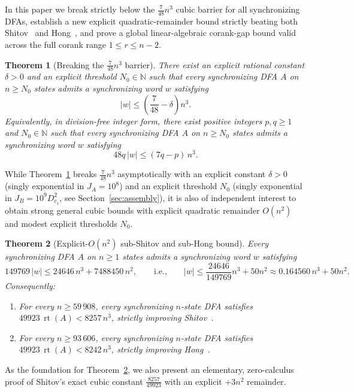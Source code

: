 \documentclass[11pt]{article}
\newtheorem{theorem}{Theorem}[section]
\theoremstyle{definition}
\theoremstyle{remark}
\newcommand{\rt}{\operatorname{rt}}
\newcommand{\N}{\mathbb{N}}
\begin{document}
In this paper we break strictly below the $\frac{7}{48} n^3$ cubic barrier for all synchronizing DFAs, establish a new explicit quadratic-remainder bound strictly beating both Shitov~\cite{Shitov2019} and Hong~\cite{Hong2026a}, and prove a global linear-algebraic corank-gap bound valid across the full corank range $1 \le r \le n - 2$.

\begin{theorem}[Breaking the $\frac{7}{48} n^3$ barrier]\label{thm:below-7-48}
There exist an explicit rational constant $\delta > 0$ and an explicit threshold $N_0 \in \N$ such that every synchronizing DFA $A$ on $n \ge N_0$ states admits a synchronizing word $w$ satisfying
\[
  |w| \le \left(\frac{7}{48} - \delta\right) n^3.
\]
Equivalently, in division-free integer form, there exist positive integers $p, q \ge 1$ and $N_0 \in \N$ such that every synchronizing DFA $A$ on $n \ge N_0$ states admits a synchronizing word $w$ satisfying
\[
  48 q \, |w| \le (7 q - p)\, n^3.
\]
\end{theorem}

While Theorem~\ref{thm:below-7-48} breaks $\frac{7}{48} n^3$ asymptotically with an explicit constant $\delta > 0$ (singly exponential in $J_A = 10^8$) and an explicit threshold $N_0$ (singly exponential in $J_B = 10^9 D_{c_1}^2$, see Section~\ref{sec:assembly}), it is also of independent interest to obtain strong general cubic bounds with explicit quadratic remainder $O(n^2)$ and modest explicit thresholds $N_0$.

\begin{theorem}[Explicit-$O(n^2)$ sub-Shitov and sub-Hong bound]\label{thm:sub-shitov}
Every synchronizing DFA $A$ on $n \ge 1$ states admits a synchronizing word $w$ satisfying
\[
  149769\, |w| \le 24646\, n^3 + 7488450\, n^2,
  \qquad\text{i.e.,}\qquad
  |w| \le \frac{24646}{149769} n^3 + 50 n^2 \approx 0.164560\, n^3 + 50 n^2.
\]
Consequently:
\begin{enumerate}[label=(\alph*), leftmargin=2em]
  \item For every $n \ge 59\,908$, every synchronizing $n$-state DFA satisfies $49923\, \rt(A) < 8257\, n^3$, strictly improving Shitov~\cite{Shitov2019}.
  \item For every $n \ge 93\,606$, every synchronizing $n$-state DFA satisfies $49923\, \rt(A) < 8242\, n^3$, strictly improving Hong~\cite{Hong2026a}.
\end{enumerate}
\end{theorem}

As the foundation for Theorem~\ref{thm:sub-shitov}, we also present an elementary, zero-calculus proof of Shitov's exact cubic constant $\frac{8257}{49923}$ with an explicit $+3n^2$ remainder.
\end{document}
